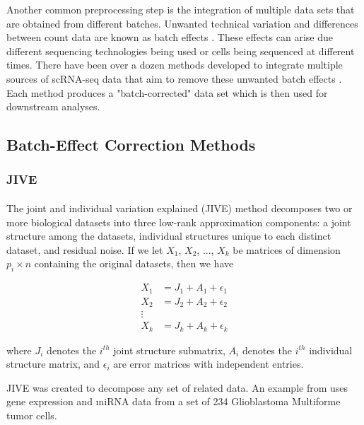 \documentclass[
12pt, %
letterpaper, %
oneside, %
headinclude,footinclude, %
BCOR5mm, %
]{scrartcl}
\begin{document}
Another common preprocessing step is the integration of multiple data sets that are obtained from different batches. Unwanted technical variation and differences between count data are known as batch effects \citep{zhang2020combat}. These effects can arise due different sequencing technologies being used or cells being sequenced at different times.
There have been over a dozen methods developed to integrate multiple sources of scRNA-seq data that aim to remove these unwanted batch effects \citep{tran2020benchmark}. Each method produces a "batch-corrected" data set which is then used for downstream analyses.


\subsection{Batch-Effect Correction Methods}

\subsubsection*{JIVE}

\paragraph*{}
The joint and individual variation explained (JIVE) method \citep{lock2013joint} decomposes two or more biological datasets into three low-rank approximation components: a joint structure among the datasets, individual structures unique to each distinct dataset, and residual noise. If we let $X_1$, $X_2$, ..., $X_k$ be matrices of dimension $p_i \times n$ containing the original datasets, then we have

\begin{align*}
    X_1 &= J_1 + A_1 + \epsilon_1 \\
    X_2 &= J_2 + A_2 + \epsilon_2 \\
    \vdots \\
    X_k &= J_k + A_k + \epsilon_k 
\end{align*}

where $J_i$ denotes the $i^{th}$ joint structure submatrix, $A_i$ denotes the $i^{th}$ individual structure matrix, and $\epsilon_i$ are error matrices with independent entries.

JIVE was created to decompose any set of related data. An example from \citet{lock2013joint} uses gene expression and miRNA data from a set of 234 Glioblastoma Multiforme tumor cells.
\end{document}
